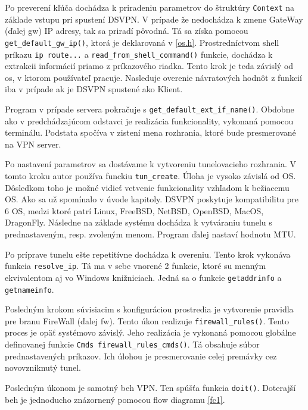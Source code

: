  Po preverení kľúča dochádza k priradeniu parametrov do štruktúry \lstinline|Context| na základe vstupu pri spustení DSVPN. V prípade že nedochádza k zmene GateWay (ďalej \acrshort{gw}) IP adresy, tak sa priradí pôvodná. Tá sa získa pomocou \\\lstinline|get_default_gw_ip()|, ktorá je deklarovaná v \ref{os.h}. Prostredníctvom shell príkazu \lstinline|ip route...| a \lstinline|read_from_shell_command()| funkcie, dochádza k extrakcii informácií priamo z príkazového riadka. Tento krok je teda závislý od \acrshort{os}, v ktorom používateľ pracuje. Nasleduje overenie návratových hodnôt z funkcií iba v prípade ak je DSVPN spustené ako Klient.
 
 Program v prípade servera pokračuje s \lstinline|get_default_ext_if_name()|. Obdobne ako v predchádzajúcom odstavci je realizácia funkcionality, vykonaná pomocou terminálu. Podstata spočíva v zistení mena rozhrania, ktoré bude presmerované na VPN server. 
 
 Po nastavení parametrov sa dostávame k vytvoreniu tunelovacieho rozhrania. V tomto kroku autor používa  funckiu \lstinline|tun_create|. Úloha je vysoko závislá od OS. Dôsledkom toho je možné vidieť vetvenie funkcionality vzhľadom k bežiacemu OS. Ako sa už spomínalo v úvode kapitoly. DSVPN poskytuje kompatibilitu pre 6 OS, medzi ktoré  patrí Linux, FreeBSD, NetBSD, OpenBSD, MacOS, DragonFly. Následne na základe systému dochádza k vytváraniu tunelu s prednastaveným, resp. zvoleným menom. Program ďalej nastaví hodnotu MTU.
 
 Po príprave tunelu ešte repetitívne dochádza k overeniu. Tento krok vykonáva funkcia \lstinline|resolve_ip|. Tá ma v sebe vnorené 2 funkcie, ktoré su menným ekvivalentom aj vo Windows knižniciach. Jedná sa o funkcie \lstinline|getaddrinfo| a \lstinline|getnameinfo|.  
 
 Posledným krokom súvisiacim s konfiguráciou prostredia je vytvorenie pravidla pre branu FireWall (ďalej \acrshort{fw}). Tento úkon realizuje \lstinline|firewall_rules()|. Tento proces je opäť systémovo závislý. Jeho realizácia je vykonaná pomocou globálne definovanej funkcie \lstinline|Cmds firewall_rules_cmds()|. Tá obsahuje súbor prednastavených príkazov. Ich úlohou je presmerovanie celej premávky cez novovzniknutý tunel.
 
 Posledným úkonom je samotný beh VPN. Ten spúšťa funkcia \lstinline|doit()|. 
 Doterajší beh je jednoducho znázornený pomocou flow diagramu \ref{fc1}.
 
